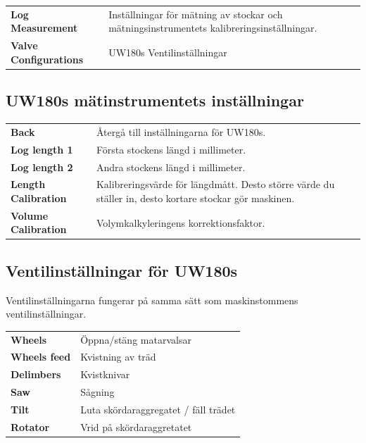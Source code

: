 \documentclass[12pt,a4paper,finnish]{uvmanual}
\begin{document}

\begin{tabular}{ L{0.2\textwidth} L{0.66\textwidth} }
\textbf{Log Measurement} & Inställningar för mätning av stockar och mätningsinstrumentets kalibreringsinställningar. \\
\textbf{Valve Configurations} & UW180s Ventilinställningar 
\end{tabular}

\FloatBarrier
\subsection{UW180s mätinstrumentets inställningar}\label{ch:settings_uw180s_meas}


\begin{tabular}{ L{0.2\textwidth} L{0.66\textwidth} }
\textbf{Back} & Återgå till inställningarna för UW180s.  \\
\textbf{Log length 1} & Första stockens längd i millimeter. \\
\textbf{Log length 2} & Andra stockens längd i millimeter. \\
\textbf{Length Calibration} & Kalibreringsvärde för längdmått. Desto större värde du ställer in, desto kortare stockar gör maskinen.  \\
\textbf{Volume Calibration} & Volymkalkyleringens korrektionsfaktor. \\
\end{tabular}

\FloatBarrier
\subsection{Ventilinställningar för UW180s}\label{ch:settings_uw180s_valves}

Ventilinställningarna fungerar på samma sätt som maskinstommens ventilinställningar.


\begin{tabular}{ L{0.2\textwidth} L{0.66\textwidth} }
\textbf{Wheels} & Öppna/stäng matarvalsar \\
\textbf{Wheels feed} & Kvistning av träd \\
\textbf{Delimbers} & Kvistknivar \\
\textbf{Saw} & Sågning \\
\textbf{Tilt} & Luta skördaraggregatet / fäll trädet  \\
\textbf{Rotator} & Vrid på skördaraggretatet \\
\end{tabular}
\end{document}
